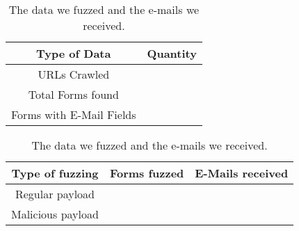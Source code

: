 \begin{table}[tbp]
	\parbox{.40\textwidth}{
			\centering
			\scriptsize
			\begin{tabular}{|c|c|}
				\hline
				\multicolumn{1}{|c|}{\textbf{Type of Data}} &
				\multicolumn{1}{c|}{\textbf{Quantity}}\\
				\hline
				URLs Crawled & \urls \\
				\hline
				Total Forms found & \forms \\
				\hline
				Forms with E-Mail Fields & \emailforms \\
				\hline
			\end{tabular}
			\caption[]{The data collected for our
				project.}
			\vspace{-5ex}
			\label{tab:data}
			
		}
	\hfill
	\parbox{.55\textwidth}{
			\centering
			\scriptsize
			\begin{tabular}{|c|c|c|}
				\hline
				\multicolumn{1}{|c|}{\textbf{Type of fuzzing}} &
				\multicolumn{1}{c|}{\textbf{Forms fuzzed}} &
				\multicolumn{1}{c|}{\textbf{E-Mails received}}\\
				\hline
				Regular payload & \fuzzed & \recd \\
				\hline
				Malicious payload & \malfuzzed & \success \\
				\hline
			\end{tabular}
			\caption[]{The data we fuzzed and the e-mails we received.}
			\vspace{-5ex}    
			\label{tab:fuzzed_data}
			
		}
\end{table}
